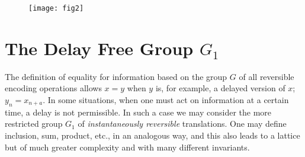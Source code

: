 \documentclass{article}[10pt, letter]
\begin{document}
\begin{figure}
	\begin{center}
		\texttt{[image: fig2]}
	\end{center}
	\caption{}\label{fig:2}
\end{figure}
	


\section{The Delay Free Group $G_1$}

The definition of equality for information based on the group $G$ of all reversible encoding operations allows $x = y$ when $y$ is, for example, a delayed version of $x$; $y_n = x_{n+a}$. In some situations, when one must act on information at a certain time, a delay is not permissible. In such a case we may consider the more restricted group $G_1$ of \textit{instantaneously reversible} translations. One may define inclusion, sum, product, etc., in an analogous way, and this also leads to a lattice but of much greater complexity and with many different invariants.

\theendnotes
\end{document}
